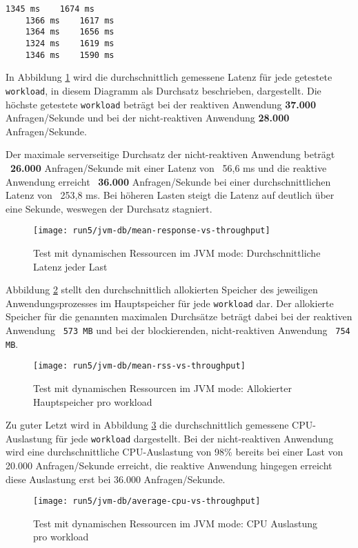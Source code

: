 \begin{lstlisting}[caption=5 gemessene Startzeiten bis zur Bearbeitung der ersten Anfrage als JVM-Anwendungen: links ist die reaktive
     Anwendung und rechts die blockierende Anwendung, captionpos=b, label=lst:starttimes_jvm_dynamic]
    1345 ms    1674 ms
    1366 ms    1617 ms
    1364 ms    1656 ms 
    1324 ms    1619 ms 
    1346 ms    1590 ms 
\end{lstlisting}

In Abbildung \ref{fig:jvm_dynamic_mean_response} wird die durchschnittlich gemessene Latenz für jede getestete \verb|workload|,
in diesem Diagramm als Durchsatz beschrieben, dargestellt.
Die höchste getestete \verb|workload| beträgt bei der reaktiven Anwendung \textbf{37.000} Anfragen/Sekunde und bei der
nicht-reaktiven Anwendung \textbf{28.000} Anfragen/Sekunde.

Der maximale serverseitige Durchsatz der nicht-reaktiven Anwendung beträgt ~\textbf{26.000} Anfragen/Sekunde mit einer
Latenz von ~56,6 ms und
die reaktive Anwendung erreicht ~\textbf{36.000} Anfragen/Sekunde bei einer durchschnittlichen Latenz von ~253,8 ms.
Bei höheren Lasten steigt die Latenz auf deutlich über eine Sekunde, weswegen der Durchsatz stagniert.
\newpage
\begin{figure}[ht!]
    \centering
    \texttt{[image: run5/jvm-db/mean-response-vs-throughput]}
    \caption{Test mit dynamischen Ressourcen im JVM mode: Durchschnittliche Latenz jeder Last}
    \label{fig:jvm_dynamic_mean_response}
\end{figure}
Abbildung \ref{fig:jvm_dynamic_mean_rss} stellt den durchschnittlich allokierten Speicher des jeweiligen Anwendungsprozesses
im Hauptspeicher für jede \verb|workload| dar. Der allokierte Speicher für die genannten maximalen Durchsätze beträgt dabei bei
der reaktiven Anwendung ~\verb|573 MB| und bei der blockierenden, nicht-reaktiven Anwendung ~\verb|754 MB|.
\newpage
\begin{figure}[ht!]
    \centering
    \texttt{[image: run5/jvm-db/mean-rss-vs-throughput]}
    \caption{Test mit dynamischen Ressourcen im JVM mode: Allokierter Hauptspeicher pro workload}
    \label{fig:jvm_dynamic_mean_rss}
\end{figure}

Zu guter Letzt wird in Abbildung \ref{fig:jvm_dynamic_avg_cpu} die durchschnittlich gemessene CPU-Auslastung für jede \verb|workload|
dargestellt. Bei der nicht-reaktiven Anwendung wird eine durchschnittliche CPU-Auslastung von 98\% bereits bei einer Last von
20.000 Anfragen/Sekunde erreicht, die reaktive Anwendung hingegen erreicht diese Auslastung erst bei 36.000 Anfragen/Sekunde.
\newpage
\begin{figure}[ht!]
    \centering
    \texttt{[image: run5/jvm-db/average-cpu-vs-throughput]}
    \caption{Test mit dynamischen Ressourcen im JVM mode: CPU Auslastung pro workload}
    \label{fig:jvm_dynamic_avg_cpu}
\end{figure}


